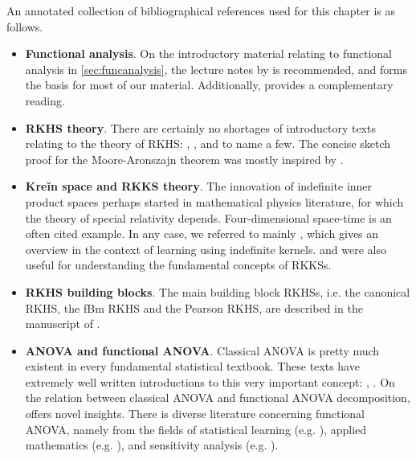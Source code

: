 \documentclass[showframe,11pt,twoside,openright]{report}
\begin{document}
An annotated collection of bibliographical references used for this chapter is as follows.
\begin{itemize}
  \item \textbf{Functional analysis}. 
  On the introductory material relating to functional analysis in \cref{sec:funcanalysis}, the lecture notes by \citet{sejdinovic2012} is recommended, and forms the basis for most of our material. 
  Additionally, \citet{rudin1987real,yamamoto2012vector,kokoszka2017introduction} provides a complementary reading.
  \item \textbf{RKHS theory}. 
  There are certainly no shortages of introductory texts relating to the theory of RKHS: \citet{steinwart2008support}, \citet{berlinet2011reproducing}, and \citet{gu2013smoothing} to name a few. 
  The concise sketch proof for the Moore-Aronszajn theorem was mostly inspired by \citet[Theorem 4]{hein2004kernels}.
  \item \textbf{Kreĭn space and RKKS theory}. 
  The innovation of indefinite inner product spaces perhaps started in mathematical physics literature, for which the theory of special relativity depends. 
  Four-dimensional space-time is an often cited example. 
  In any case, we referred to mainly \citet{ong2004learning}, which gives an overview in the context of learning using indefinite kernels. 
  \citet{alpay1991some} and \citet{zafeiriou2012subspace} were also useful for understanding the fundamental concepts of RKKSs.
  \item \textbf{RKHS building blocks}. 
  The main building block RKHSs, i.e. the canonical RKHS, the fBm RKHS and the Pearson RKHS, are described in the manuscript of \citet{bergsma2017}.
  \item \textbf{ANOVA and functional ANOVA}. 
  Classical ANOVA is pretty much existent in every fundamental statistical textbook. These texts have extremely well written introductions to this very important concept: \citet[ch. 11]{casella2002statistical}, \citet[ch. 3]{dean1999design}. 
  On the relation between classical ANOVA and functional ANOVA decomposition, \citet{gu2013smoothing} offers novel insights. There is diverse literature concerning functional ANOVA, namely from the fields of statistical learning (e.g. \cite{wahba1990spline}), applied mathematics (e.g. \cite{kuo2010decompositions}), and sensitivity analysis (e.g. \cite{sobol2001global,durrande2013anova}). 
\end{itemize}


\hClosingStuffStandalone
\end{document}
